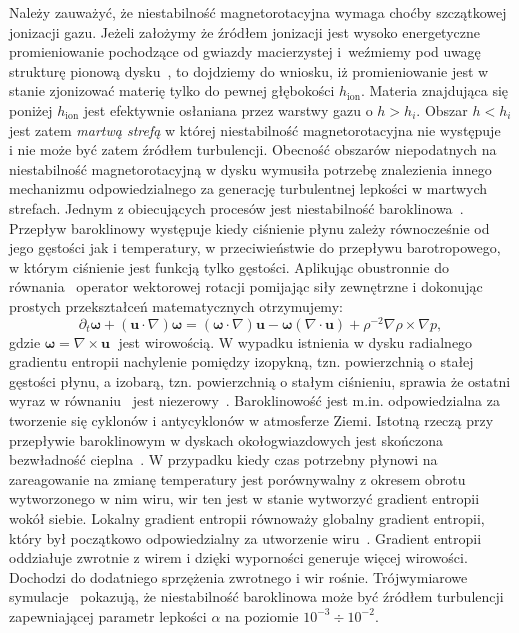 \par Należy zauważyć, że niestabilność magnetorotacyjna wymaga choćby
szczątkowej jonizacji gazu. Jeżeli założymy że źródłem jonizacji jest wysoko
energetyczne promieniowanie pochodzące od gwiazdy macierzystej i~weźmiemy pod
uwagę strukturę pionową dysku~, to dojdziemy do wniosku, iż
promieniowanie jest w stanie zjonizować materię tylko do pewnej głębokości
$h_{\textrm{ion}}$. Materia znajdująca się poniżej $h_{\textrm{ion}}$ jest
efektywnie osłaniana przez warstwy gazu o $h > h_i$.  Obszar $h < h_i$ jest
zatem \emph{martwą strefą} w której niestabilność magnetorotacyjna nie
występuje~\cite{DFT10} i nie może być zatem źródłem turbulencji. 
Obecność obszarów niepodatnych na niestabilność magnetorotacyjną w dysku
wymusiła potrzebę znalezienia innego mechanizmu odpowiedzialnego za generację
turbulentnej lepkości w martwych strefach. Jednym z obiecujących procesów jest
niestabilność baroklinowa~\cite{KB03, Kl04}. Przepływ baroklinowy występuje
kiedy ciśnienie płynu zależy równocześnie od jego gęstości jak i temperatury, w
przeciwieństwie do przepływu barotropowego, w którym ciśnienie jest funkcją
tylko gęstości. Aplikując obustronnie do równania~ operator
wektorowej rotacji pomijając siły zewnętrzne i dokonując prostych przekształceń
matematycznych otrzymujemy:
%
\begin{equation}
   \partial_t \mathbf{\omega} + (\mathbf{u}\cdot\nabla)\mathbf{\omega} =
   (\mathbf{\omega}\cdot\nabla)\mathbf{u} -
   \mathbf{\omega}\left(\nabla\cdot\mathbf{u}\right) + \rho^{-2}\nabla \rho \times
      \nabla p,
   \label{eq:vort}
\end{equation}
%
gdzie $\mathbf{\omega}=\nabla\times\mathbf{u}\;$ jest wirowością. 
W wypadku istnienia w dysku radialnego gradientu entropii nachylenie pomiędzy izopykną,
tzn. powierzchnią o stałej gęstości płynu, a izobarą, tzn. powierzchnią o
stałym ciśnieniu, sprawia że ostatni wyraz w równaniu~ jest
niezerowy~\cite{LK11}. Baroklinowość jest m.in. odpowiedzialna za tworzenie się
cyklonów i antycyklonów w atmosferze Ziemi. Istotną rzeczą przy przepływie
baroklinowym w dyskach okołogwiazdowych jest skończona bezwładność
cieplna~\cite{P07a, P07b}. W przypadku kiedy czas potrzebny płynowi na
zareagowanie na zmianę temperatury jest porównywalny z okresem obrotu
wytworzonego w nim wiru, wir ten jest w stanie wytworzyć gradient entropii wokół
siebie. Lokalny gradient entropii równoważy globalny gradient entropii, który
był początkowo odpowiedzialny za utworzenie wiru~\cite{KB03}. Gradient entropii
oddziałuje zwrotnie z wirem i dzięki wyporności generuje więcej wirowości.
Dochodzi do dodatniego sprzężenia zwrotnego i wir rośnie. Trójwymiarowe
symulacje~\cite{KB03} pokazują, że niestabilność baroklinowa może być źródłem
turbulencji zapewniającej parametr lepkości $\alpha$ na poziomie
$10^{-3}\div10^{-2}$.

